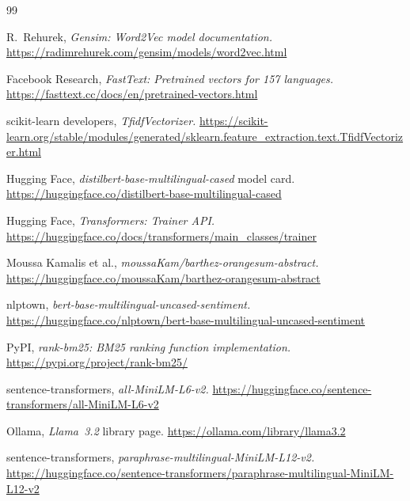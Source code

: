 \documentclass[11pt,a4paper]{article}
\begin{document}
\begin{thebibliography}{99}

R.~Rehurek, \emph{Gensim: Word2Vec model documentation.}
\url{https://radimrehurek.com/gensim/models/word2vec.html}

Facebook Research, \emph{FastText: Pretrained vectors for 157 languages.}
\url{https://fasttext.cc/docs/en/pretrained-vectors.html}

scikit-learn developers, \emph{TfidfVectorizer.}
\url{https://scikit-learn.org/stable/modules/generated/sklearn.feature_extraction.text.TfidfVectorizer.html}

Hugging Face, \emph{distilbert-base-multilingual-cased} model card.
\url{https://huggingface.co/distilbert-base-multilingual-cased}

Hugging Face, \emph{Transformers: Trainer API.}
\url{https://huggingface.co/docs/transformers/main_classes/trainer}

Moussa Kamalis et al., \emph{moussaKam/barthez-orangesum-abstract.}
\url{https://huggingface.co/moussaKam/barthez-orangesum-abstract}

nlptown, \emph{bert-base-multilingual-uncased-sentiment.}
\url{https://huggingface.co/nlptown/bert-base-multilingual-uncased-sentiment}

PyPI, \emph{rank-bm25: BM25 ranking function implementation.}
\url{https://pypi.org/project/rank-bm25/}

sentence-transformers, \emph{all-MiniLM-L6-v2.}
\url{https://huggingface.co/sentence-transformers/all-MiniLM-L6-v2}

Ollama, \emph{Llama~3.2} library page.
\url{https://ollama.com/library/llama3.2}

sentence-transformers, \emph{paraphrase-multilingual-MiniLM-L12-v2.}
\url{https://huggingface.co/sentence-transformers/paraphrase-multilingual-MiniLM-L12-v2}

\end{thebibliography}
\end{document}

